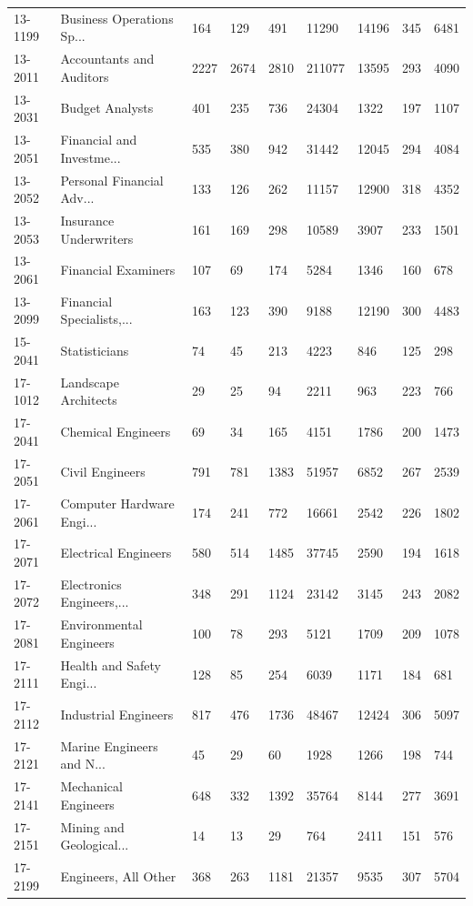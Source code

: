 \begin{longtable}{p{0.9cm}p{3.4cm}p{1.0cm}p{1.05cm}p{1.1cm}p{1.05cm}p{1.0cm}p{1.0cm}p{1.1cm}}
13-1199 & Business Operations Sp... & 164 & 129 & 491 & 11290 & 14196 & 345 & 6481 \\
13-2011 & Accountants and Auditors & 2227 & 2674 & 2810 & 211077 & 13595 & 293 & 4090 \\
13-2031 & Budget Analysts & 401 & 235 & 736 & 24304 & 1322 & 197 & 1107 \\
13-2051 & Financial and Investme... & 535 & 380 & 942 & 31442 & 12045 & 294 & 4084 \\
13-2052 & Personal Financial Adv... & 133 & 126 & 262 & 11157 & 12900 & 318 & 4352 \\
13-2053 & Insurance Underwriters & 161 & 169 & 298 & 10589 & 3907 & 233 & 1501 \\
13-2061 & Financial Examiners & 107 & 69 & 174 & 5284 & 1346 & 160 & 678 \\
13-2099 & Financial Specialists,... & 163 & 123 & 390 & 9188 & 12190 & 300 & 4483 \\
15-2041 & Statisticians & 74 & 45 & 213 & 4223 & 846 & 125 & 298 \\
17-1012 & Landscape Architects & 29 & 25 & 94 & 2211 & 963 & 223 & 766 \\
17-2041 & Chemical Engineers & 69 & 34 & 165 & 4151 & 1786 & 200 & 1473 \\
17-2051 & Civil Engineers & 791 & 781 & 1383 & 51957 & 6852 & 267 & 2539 \\
17-2061 & Computer Hardware Engi... & 174 & 241 & 772 & 16661 & 2542 & 226 & 1802 \\
17-2071 & Electrical Engineers & 580 & 514 & 1485 & 37745 & 2590 & 194 & 1618 \\
17-2072 & Electronics Engineers,... & 348 & 291 & 1124 & 23142 & 3145 & 243 & 2082 \\
17-2081 & Environmental Engineers & 100 & 78 & 293 & 5121 & 1709 & 209 & 1078 \\
17-2111 & Health and Safety Engi... & 128 & 85 & 254 & 6039 & 1171 & 184 & 681 \\
17-2112 & Industrial Engineers & 817 & 476 & 1736 & 48467 & 12424 & 306 & 5097 \\
17-2121 & Marine Engineers and N... & 45 & 29 & 60 & 1928 & 1266 & 198 & 744 \\
17-2141 & Mechanical Engineers & 648 & 332 & 1392 & 35764 & 8144 & 277 & 3691 \\
17-2151 & Mining and Geological... & 14 & 13 & 29 & 764 & 2411 & 151 & 576 \\
17-2199 & Engineers, All Other & 368 & 263 & 1181 & 21357 & 9535 & 307 & 5704 \\

\end{longtable}
